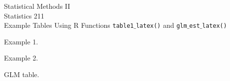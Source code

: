 \documentclass{article}
\begin{document}
\begin{center}
Statistical Methods II\\
Statistics 211\\

Example Tables Using R Functions \texttt{table1$\_$latex()} and \texttt{glm$\_$est$\_$latex()}

\end{center}


\begin{table}[h!]
\caption{Example 1.}
\begin{center}

\end{center}
\end{table}


\begin{center}
\begin{table}
\caption{Example 2.}
\begin{center}

\end{center}
\end{table}
\end{center}


\begin{center}
\begin{table}
\caption{GLM table.}
\begin{center}

\end{center}
\end{table}
\end{center}
\end{document}
